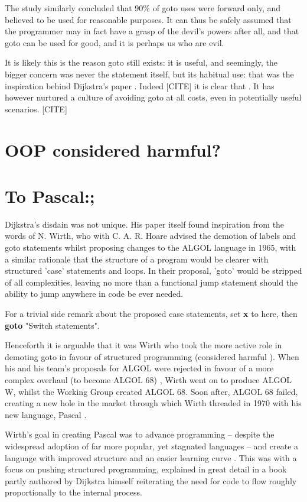 \documentclass{journal}
\begin{document}
The study similarly concluded that 90\% of goto uses were forward only, and believed to be used for reasonable purposes. It can thus be safely assumed that the programmer may in fact have a grasp of the devil's powers after all, and that goto can be used for good, and it is perhaps us who are evil.

It is likely this is the reason goto still exists: it is useful, and seemingly, the bigger concern was never the statement itself, but its habitual use: that was the inspiration behind Dijkstra's paper \cite{goto}. Indeed [CITE] it is clear that . It has however nurtured a culture of avoiding goto at all costs, even in potentially useful scenarios. [CITE]

\section{OOP considered harmful?}

\section{To Pascal:;}
Dijkstra's disdain was not unique. His paper itself found inspiration from the words of N. Wirth, who with C. A. R. Hoare \cite{algolwirth} advised the demotion of labels and goto statements whilst proposing changes to the ALGOL language in 1965, with a similar rationale that the structure of a program would be clearer with structured 'case' statements and loops. In their proposal, 'goto' would be stripped of all complexities, leaving no more than a functional jump statement should the ability to jump anywhere in code be ever needed.

For a trivial side remark about the proposed case statements, set \textbf{x} to here, then \textbf{goto} "Switch statements".

Henceforth it is arguable that it was Wirth who took the more active role in demoting goto in favour of structured programming (considered harmful \cite{harmfulstructure}). When his and his team's proposals for ALGOL were rejected in favour of a more complex overhaul (to become ALGOL 68) \cite{pascalrecollections}, Wirth went on to produce ALGOL W, whilst the Working Group created ALGOL 68. Soon after, ALGOL 68 failed, creating a new hole in the market through which Wirth threaded in 1970 with his new language, Pascal \cite{pascalrecollections}.

Wirth's goal in creating Pascal was to advance programming -- despite the widespread adoption of far more popular, yet stagnated languages -- and create a language with improved structure and an easier learning curve \cite{pascal}. This was with a focus on pushing structured programming, explained in great detail in a book partly authored by Dijkstra himself \cite{structured} reiterating the need for code to flow roughly proportionally to the internal process.
\end{document}
